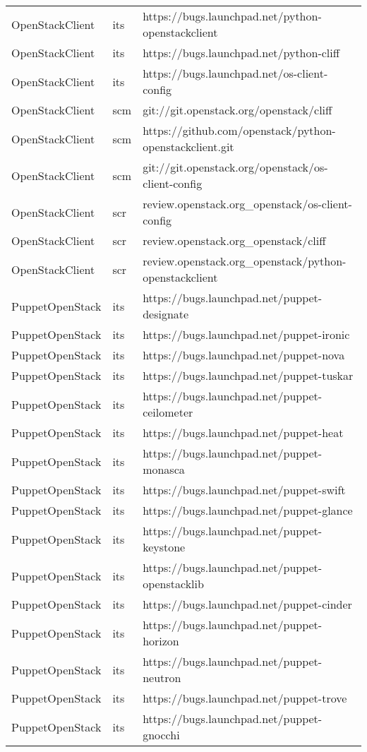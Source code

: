 \begin{center}
\begin{longtable}{|p{4cm}|p{1cm}|p{10cm}|}
OpenStackClient&its&https://bugs.launchpad.net/python-openstackclient\\ 
OpenStackClient&its&https://bugs.launchpad.net/python-cliff\\ 
OpenStackClient&its&https://bugs.launchpad.net/os-client-config\\ 
OpenStackClient&scm&git://git.openstack.org/openstack/cliff\\ 
OpenStackClient&scm&https://github.com/openstack/python-openstackclient.git\\ 
OpenStackClient&scm&git://git.openstack.org/openstack/os-client-config\\ 
OpenStackClient&scr&review.openstack.org\_openstack/os-client-config\\ 
OpenStackClient&scr&review.openstack.org\_openstack/cliff\\ 
OpenStackClient&scr&review.openstack.org\_openstack/python-openstackclient\\ 
PuppetOpenStack&its&https://bugs.launchpad.net/puppet-designate\\ 
PuppetOpenStack&its&https://bugs.launchpad.net/puppet-ironic\\ 
PuppetOpenStack&its&https://bugs.launchpad.net/puppet-nova\\ 
PuppetOpenStack&its&https://bugs.launchpad.net/puppet-tuskar\\ 
PuppetOpenStack&its&https://bugs.launchpad.net/puppet-ceilometer\\ 
PuppetOpenStack&its&https://bugs.launchpad.net/puppet-heat\\ 
PuppetOpenStack&its&https://bugs.launchpad.net/puppet-monasca\\ 
PuppetOpenStack&its&https://bugs.launchpad.net/puppet-swift\\ 
PuppetOpenStack&its&https://bugs.launchpad.net/puppet-glance\\ 
PuppetOpenStack&its&https://bugs.launchpad.net/puppet-keystone\\ 
PuppetOpenStack&its&https://bugs.launchpad.net/puppet-openstacklib\\ 
PuppetOpenStack&its&https://bugs.launchpad.net/puppet-cinder\\ 
PuppetOpenStack&its&https://bugs.launchpad.net/puppet-horizon\\ 
PuppetOpenStack&its&https://bugs.launchpad.net/puppet-neutron\\ 
PuppetOpenStack&its&https://bugs.launchpad.net/puppet-trove\\ 
PuppetOpenStack&its&https://bugs.launchpad.net/puppet-gnocchi\\ 

\end{longtable}
\end{center}
